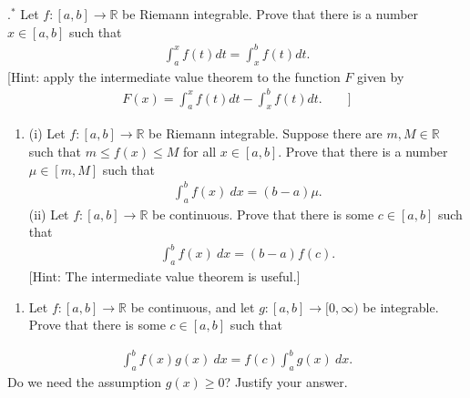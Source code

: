 \documentclass[letterpaper,10pt,english]{jupyterBook}
\begin{document}
\label{\detokenize{Problems:id74}}
.\(^*\) Let \(f\colon [a,b]\rightarrow \mathbb{R}\) be Riemann integrable. Prove that there is a number \(x\in [a,b]\) such that
\begin{equation*}
\begin{split}
\int_a^x f(t)dt = \int_x^b f(t)dt.
\end{split}
\end{equation*}
\sphinxAtStartPar
{[}Hint: apply the intermediate value theorem to the function \(F\) given by
\begin{equation*}
\begin{split}
F(x) = \int_a^x f(t)dt - \int_x^b f(t)dt .\qquad ]
\end{split}
\end{equation*}\label{\detokenize{Problems:id75}}\begin{enumerate}
%
\setcounter{enumi}{74}
\item {} 
\sphinxAtStartPar
(i) Let \(f\colon [a,b]\rightarrow \mathbb{R}\) be Riemann integrable. Suppose there are \(m,M\in \mathbb{R}\) such that \(m\leq f(x)\leq M\) for all \(x\in [a,b]\). Prove that there is a number \(\mu \in [m,M]\) such that
\begin{equation*}
\begin{split}
    \int_a^b f(x)\ dx = (b-a)\mu .
    \end{split}
\end{equation*}
\sphinxAtStartPar
(ii) Let \(f\colon [a,b]\rightarrow \mathbb{R}\) be continuous. Prove that there is some \(c \in [a,b]\) such that
\begin{equation*}
\begin{split}
    \int_a^b f(x)\ dx = (b-a)f(c) .
    \end{split}
\end{equation*}
\sphinxAtStartPar
{[}Hint: The intermediate value theorem is useful.{]}

\end{enumerate}
\label{\detokenize{Problems:id76}}\begin{enumerate}
%
\setcounter{enumi}{75}
\item {} 
\sphinxAtStartPar
Let \(f\colon [a,b]\rightarrow \mathbb{R}\) be continuous, and let \(g\colon [a,b]\rightarrow [0,\infty )\) be integrable. Prove that there is some \(c \in [a,b]\) such that

\end{enumerate}
\begin{equation*}
\begin{split}
\int_a^b f(x)g(x)\ dx = f(c) \int_a^b g(x)\ dx .
\end{split}
\end{equation*}
\sphinxAtStartPar
Do we need the assumption \(g(x)\geq 0\)? Justify your answer.
\end{document}
